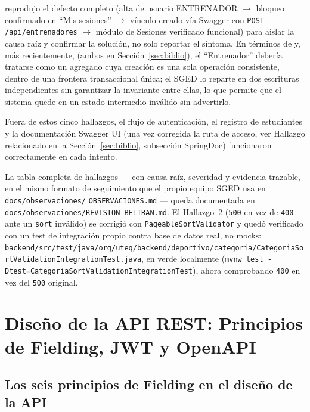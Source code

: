 \documentclass[12pt,a4paper]{article}
\begin{document}
\begin{enumerate}
    reprodujo el defecto completo (alta de usuario ENTRENADOR $\rightarrow$ bloqueo confirmado
    en ``Mis sesiones'' $\rightarrow$ vínculo creado vía Swagger con
    \texttt{POST /api/entrenadores} $\rightarrow$ módulo de Sesiones verificado funcional) para
    aislar la causa raíz y confirmar la solución, no solo reportar el síntoma. En términos de
    \textcite{evans2003} y, más recientemente, \textcite{kleppmann2017} (ambos en
    Sección~\ref{sec:biblio}), el ``Entrenador'' debería tratarse como un agregado cuya
    creación es una sola operación consistente, dentro de una frontera transaccional única; el
    SGED lo reparte en dos escrituras independientes sin garantizar la invariante entre ellas,
    lo que permite que el sistema quede en un estado intermedio inválido sin advertirlo.
\end{enumerate}

Fuera de estos cinco hallazgos, el flujo de autenticación, el registro de estudiantes y la
documentación Swagger UI (una vez corregida la ruta de acceso, ver Hallazgo relacionado en la
Sección~\ref{sec:biblio}, subsección SpringDoc) funcionaron correctamente en cada intento.

La tabla completa de hallazgos --- con causa raíz, severidad y evidencia trazable, en el mismo
formato de seguimiento que el propio equipo SGED usa en \texttt{docs/observaciones/}
\texttt{OBSERVACIONES.md} --- queda documentada en
\texttt{docs/observaciones/REVISION-BELTRAN.md}. El Hallazgo~2 (\texttt{500} en vez de
\texttt{400} ante un \texttt{sort} inválido) se corrigió con \texttt{PageableSortValidator} y
quedó verificado con un test de integración propio contra base de datos real, no mocks:
\texttt{backend/src/test/\allowbreak java/\allowbreak org/uteq/backend/\allowbreak deportivo/\allowbreak categoria/\allowbreak CategoriaSortValidationIntegrationTest.java},
en verde localmente (\texttt{mvnw test -Dtest=CategoriaSortValidationIntegrationTest}), ahora
comprobando \texttt{400} en vez del \texttt{500} original.

\section{Diseño de la API REST: Principios de Fielding, JWT y OpenAPI}
\label{sec:api}

\subsection{Los seis principios de Fielding en el diseño de la API}
\end{document}
